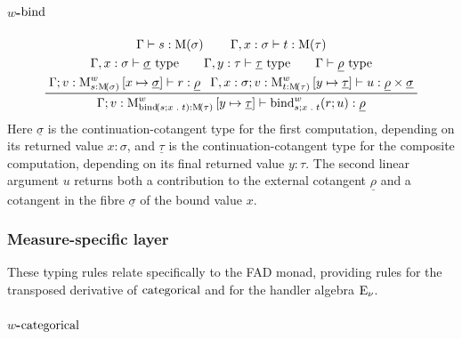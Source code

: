 \documentclass[11pt,a4paper]{article}
\theoremstyle{definition}
\theoremstyle{remark}
\providecommand{\lintype}[1]{\underline{#1}}
\begin{document}
\paragraph{\( w \)-\( \opn[b]{bind} \)}

\begin{equation*}
  \begin{gathered}
    \Gamma \vdash s : \Fun[nn]{ \opn[b]{M} }{ \sigma }
    \qquad
    \Gamma, x : \sigma \vdash t : \Fun[nn]{ \opn[b]{M} }{ \tau }
    \\
    \Gamma, x : \sigma \vdash \lintype{\sigma} \text{ type}
    \qquad
    \Gamma, y : \tau \vdash \lintype{\tau} \text{ type}
    \qquad
    \Gamma \vdash \lintype{\rho} \text{ type}
    \\
    \prftree{
      \Gamma; v : \opn[b]{M}^{w}_{s : \Fun[nn]{ \opn[b]{M} }{ \sigma }}
      \left[ x\mapsto \lintype{\sigma} \right]
      \vdash r : \lintype{\rho}
    }{
      \Gamma, x : \sigma ; v : \opn[b]{M}^{w}_{t : \Fun[nn]{ \opn[b]{M} }{ \tau }}
      \left[ y \mapsto \lintype{\tau} \right]
      \vdash u : \lintype{\rho} \times \lintype{\sigma}
    }{
      \Gamma; v : \opn[b]{M}^{w}_{\fn[n]{ \opn[b]{bind} }{ s; x \; . \; t } : \Fun[nn]{ \opn[b]{M} }{ \tau }}
      \left[ y \mapsto \lintype{\tau} \right]
      \vdash \fn[n]{ \opn[b]{bind}^{w}_{s; x \; . \; t} }{ r; u } : \lintype{\rho}
    }
  \end{gathered}
\end{equation*}
Here \(\lintype{\sigma}\) is the continuation-cotangent type for the first
computation, depending on its returned value \(x:\sigma\), and
\(\lintype{\tau}\) is the continuation-cotangent type for the composite
computation, depending on its final returned value \(y:\tau\).  The second
linear argument \(u\) returns both a contribution to the external cotangent
\(\lintype{\rho}\) and a cotangent in the fibre \(\lintype{\sigma}\) of the
bound value \(x\).

\subsubsection{Measure-specific layer}

These typing rules relate specifically to the FAD monad, providing rules for the
transposed derivative of \( \opn[b]{categorical} \) and for the handler algebra
\( \opn[b]{E}_{\nu} \).

\paragraph{\( w \)-\( \opn[b]{categorical} \)}
\end{document}
